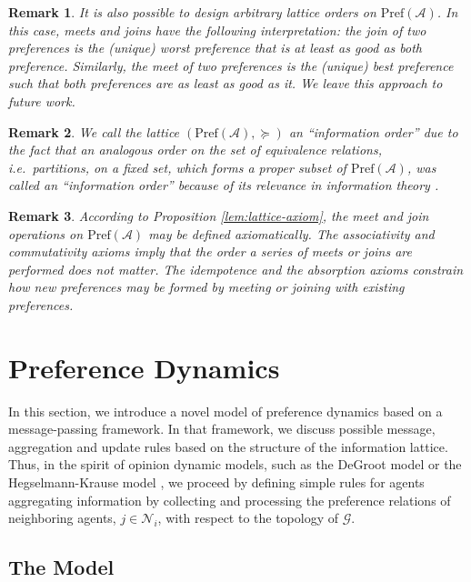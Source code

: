 \documentclass[conference]{ieeeconf}
\newcommand{\N}{\mathcal{N}}
\newcommand{\A}{\mathcal{A}}
\newcommand{\G}{\mathcal{G}}
\newcommand{\Pref}{\mathrm{Pref}}
\newtheorem{remark}{Remark}
\begin{document}
\begin{remark}
    It is also possible to design arbitrary lattice orders on $\Pref(\A)$. In this case, meets and joins have the following interpretation: the join of two preferences is the (unique) worst preference that is at least as good as both preference. Similarly, the meet of two preferences is the (unique) best preference such that both preferences are as least as good as it. We leave this approach to future work.
\end{remark}
\begin{remark}
    We call the lattice $(\Pref(\A), \succeq)$ an ``information order'' due to the fact that an analogous order on the set of equivalence relations, i.e.~partitions, on a fixed set, which forms a proper subset of $\Pref(\A)$, was called an ``information order'' because of its relevance in information theory \cite{shannon}.
\end{remark}
\begin{remark}
    According to Proposition \ref{lem:lattice-axiom}, the meet and join operations on $\Pref(\A)$ may be defined axiomatically. The associativity and commutativity axioms imply that the order a series of meets or joins are performed does not matter. The idempotence and the absorption axioms constrain how new preferences may be formed by meeting or joining with existing preferences.
\end{remark}


\section{Preference Dynamics}
\label{sec:dynamics}

In this section, we introduce a novel model of preference dynamics based on a message-passing framework. In that framework, we discuss possible message, aggregation and update rules based on the structure of the information lattice. Thus, in the spirit of opinion dynamic models, such as the DeGroot model \cite{degroot1974} or the Hegselmann-Krause model \cite{hegselmann2002}, we proceed by defining simple rules for agents aggregating information by collecting and processing the preference relations of neighboring agents, $j \in \N_i$, with respect to the topology of $\G$.

\subsection{The Model}
\end{document}
